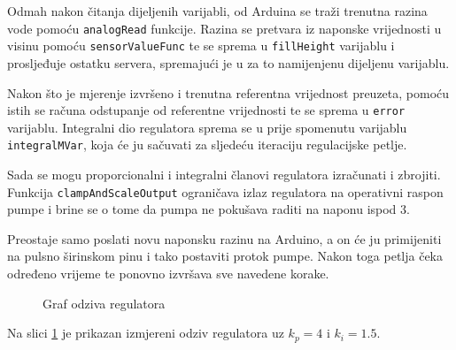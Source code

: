 Odmah nakon čitanja dijeljenih varijabli, od Arduina se traži trenutna
razina vode pomoću \texttt{analogRead} funkcije. Razina se pretvara
iz naponske vrijednosti u visinu pomoću \texttt{sensorValueFunc} te
se sprema u \texttt{fillHeight} varijablu i prosljeđuje ostatku
servera, spremajući je u za to namijenjenu dijeljenu varijablu.

Nakon što je mjerenje izvršeno i trenutna referentna vrijednost preuzeta,
pomoću istih se računa odstupanje od referentne vrijednosti te se sprema u
\texttt{error} varijablu. Integralni dio regulatora sprema se u
prije spomenutu varijablu \texttt{integralMVar}, koja će ju
sačuvati za sljedeću iteraciju regulacijske petlje.

Sada se mogu proporcionalni i integralni članovi regulatora izračunati i
zbrojiti. Funkcija \texttt{clampAndScaleOutput} ograničava izlaz
regulatora na operativni raspon pumpe i brine se o tome da pumpa ne pokušava
raditi na naponu ispod \unit{3}{\volt}.

Preostaje samo poslati novu naponsku razinu na Arduino, a on će ju primijeniti na
pulsno širinskom pinu i tako postaviti protok pumpe. Nakon toga petlja čeka
određeno vrijeme te ponovno izvršava sve navedene korake.

\begin{figure}[H]
\centering
{}
\caption{Graf odziva regulatora}
\label{fig:step_response}
\end{figure}

Na slici \ref{fig:step_response} je prikazan izmjereni odziv regulatora uz $k_p = 4$ i
$k_i = 1.5$.
